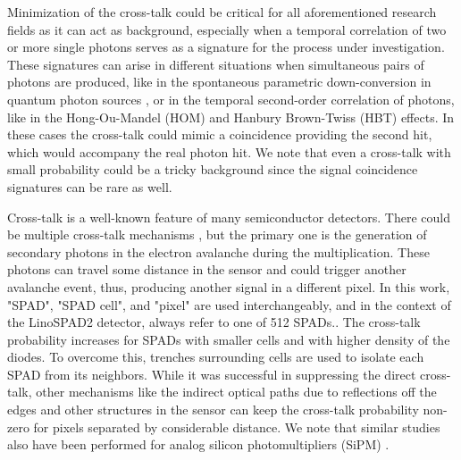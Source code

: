 \documentclass[a4paper,11pt]{article}
\begin{document}
Minimization of the cross-talk could be critical for all aforementioned research fields as it can act as background, especially when a temporal correlation of two or more single photons serves as a signature for the process under investigation. These signatures can arise in different situations when simultaneous pairs of photons are produced, like in the spontaneous parametric down-conversion in quantum photon sources \cite{SPDC_general, PRL_Oxford_spdc2008, spdc_grice_PRA97}, or in the temporal second-order correlation of photons, like in the Hong-Ou-Mandel (HOM) \cite{HOM_effect, Bouchard_HOM_review, Sensors2020_Nomerotski} and Hanbury Brown-Twiss (HBT) \cite{brown1957interferometry, brown1958interferometry1} effects. In these cases the cross-talk could mimic a coincidence providing the second hit, which would accompany the real photon hit. We note that even a cross-talk with small probability could be a tricky background since the signal coincidence signatures can be rare as well.

Cross-talk is a well-known feature of many semiconductor detectors. There could be multiple cross-talk mechanisms \cite{rech2007depth, rech2008optical, xu2014crosstalk, xu2016cross, ficorella2016crosstalk, kroger2017high, ficorella2017crosstalk, jahromi2018timing, ratti2021cross}, but the primary one is the generation of secondary photons in the electron avalanche during the multiplication. These photons can travel some distance in the sensor and could trigger another avalanche event, thus, producing another signal in a different pixel. In this work, "SPAD", "SPAD cell", and "pixel" are used interchangeably, and in the context of the LinoSPAD2 detector, always refer to one of 512 SPADs.. The cross-talk probability increases for SPADs with smaller cells and with higher density of the  diodes. To overcome this, trenches surrounding cells are used to isolate each SPAD from its neighbors. 
While it was successful in suppressing the direct cross-talk, other mechanisms like the indirect optical paths due to reflections off the edges and other structures in the sensor can keep the cross-talk probability non-zero for pixels separated by considerable distance. We note that similar studies also have been performed for analog silicon photomultipliers (SiPM) \cite{Renker2009, Nakamura2019}.
\end{document}
